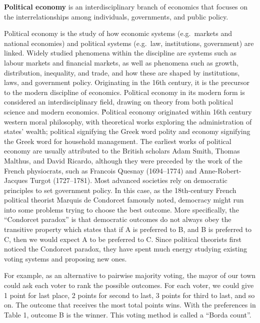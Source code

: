 \textbf{Political economy} is an interdisciplinary branch of economics that focuses on the interrelationships among
individuals, governments, and public policy.
\ed

Political economy is the study of how economic systems (e.g.\ markets and national economies) and political systems
(e.g.\ law, institutions, government) are linked. Widely studied phenomena within the discipline are systems
such as labour markets and financial markets, as well as phenomena such as growth, distribution, inequality, and
trade, and how these are shaped by institutions, laws, and government policy. Originating in the 16th century, it is
the precursor to the modern discipline of economics. Political economy in its modern form is considered an
interdisciplinary field, drawing on theory from both political science and modern economics. \v

Political economy originated within 16th century western moral philosophy, with theoretical works exploring the
administration of states' wealth; political signifying the Greek word polity and economy signifying the Greek
word for household management. The earliest works of political economy are usually attributed to the British
scholars Adam Smith, Thomas Malthus, and David Ricardo, although they were preceded by the work of the French
physiocrats, such as Francois Quesnay (1694–1774) and Anne-Robert-Jacques Turgot (1727–1781). \v

Most advanced societies rely on democratic principles to set government policy. In this case, as the 18th-century
French political theorist Marquis de Condorcet famously noted, democracy might run into some problems trying to
choose the best outcome. More specifically, the ``Condorcet paradox'' is that democratic outcomes do not always obey
the transitive property which states that if A is preferred to B, and B is preferred to C, then we would expect A to
be preferred to C. Since political theorists first noticed the Condorcet paradox, they have spent much energy studying
existing voting systems and proposing new ones.

\be
For example, as an alternative to pairwise majority voting, the mayor of our town could ask each voter to rank
the possible outcomes. For each voter, we could give 1 point for last place, 2 points for second to last, 3 points
for third to last, and so on. The outcome that receives the most total points wins. With the preferences in Table 1,
outcome B is the winner. This voting method is called a ``Borda count''.
\ee

